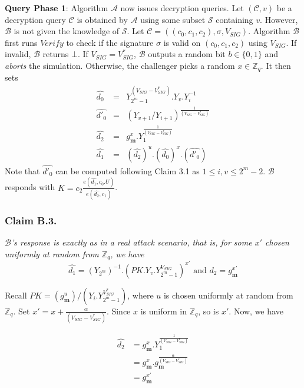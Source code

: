 \noindent\textbf{Query Phase 1}: Algorithm $\mathcal{A}$ now issues decryption queries. Let $(\mathcal{C},v)$ be a decryption query $\mathcal{C}$ is obtained by $\mathcal{A}$ using some subset $\mathcal{S}$ containing $v$. However, $\mathcal{B}$ is not given the knowledge of $\mathcal{S}$. Let $\mathcal{C}=((c_0,c_1,c_2),\sigma,V_{SIG})$. Algorithm $\mathcal{B}$ first runs $Verify$ to check if the signature $\sigma$ is valid on $(c_0,c_1,c_2)$ using $V_{SIG}$. If invalid, $\mathcal{B}$ returns $\bot$. If $V_{SIG} = V^{*}_{SIG}$, $\mathcal{B}$ outputs a random bit $b\in\{0,1\}$ and \emph{aborts} the simulation. Otherwise, the challenger picks a random $x\in\mathbb{Z}_q$. It then sets
\begin{eqnarray}
 \hat{d_0}&=&Y^{(V_{SIG}-V^{*}_{SIG})}_{2^m-1}.Y_v.Y^{-1}_i\nonumber\\
 \hat{d'_0}&=&(Y_{v+1}/Y_{i+1})^{\frac{1}{(V_{SIG}-V^{*}_{SIG})}}\nonumber \\
 \hat{d_2}&=&g^{x}_{\mathbf{m}}.Y^{\frac{1}{(V_{SIG}-V^{*}_{SIG})}}_1\nonumber\\
 \hat{d_1}&=&\left(\hat{d_2}\right)^u.\left(\hat{d_0}\right)^x.\left(\hat{d'_0}\right) \nonumber 
\end{eqnarray}
\noindent Note that $\hat{d'_0}$ can be computed following Claim 3.1 as $1\leq i,v \leq 2^m-2$. $\mathcal{B}$ responds with $K=c_2\frac{{e}(\hat{d_1},c_0.U)}{{e}(\hat{d_2},c_1)}$. 

\subsubsection{Claim B.3.} \textit{$\mathcal{B}$'s response is exactly as in a real attack scenario, that is, for some $x'$ chosen uniformly at random from $\mathbb{Z}_q$, we have} 
\begin{equation}
\hat{d_1} = \left({Y_{2^m}}\right)^{-1}.\left(PK.Y_v.Y^{V_{SIG}}_{2^m-1}\right)^{x'}  \text{ and }  \hat{d_2} = g^{x'}_{\mathbf{m}}\nonumber
\end{equation}

 Recall $PK=\left({g^u_{\mathbf{m}}}\right)/{\left(Y_i.Y^{V^{*}_{SIG}}_{2^m-1}\right)}$, where $u$ is chosen uniformly at random from $\mathbb{Z}_q$. Set $x'=x+\frac{\alpha}{(V_{SIG}-V^{*}_{SIG})}$. Since $x$ is uniform in $\mathbb{Z}_q$, so is $x'$. Now, we have 

\begin{equation}
\begin{split}
 \hat{d_2}&=g^{x}_{\mathbf{m}}.Y^{\frac{1}{(V_{SIG}-V^{*}_{SIG})}}_1\\
 &= g^{x}_{\mathbf{m}}.g^{\frac{\alpha}{(V_{SIG}-V^{*}_{SIG})}}_{\mathbf{m}}\\
 &= g^{x'}_{\mathbf{m}}\nonumber
\end{split}
\end{equation}

